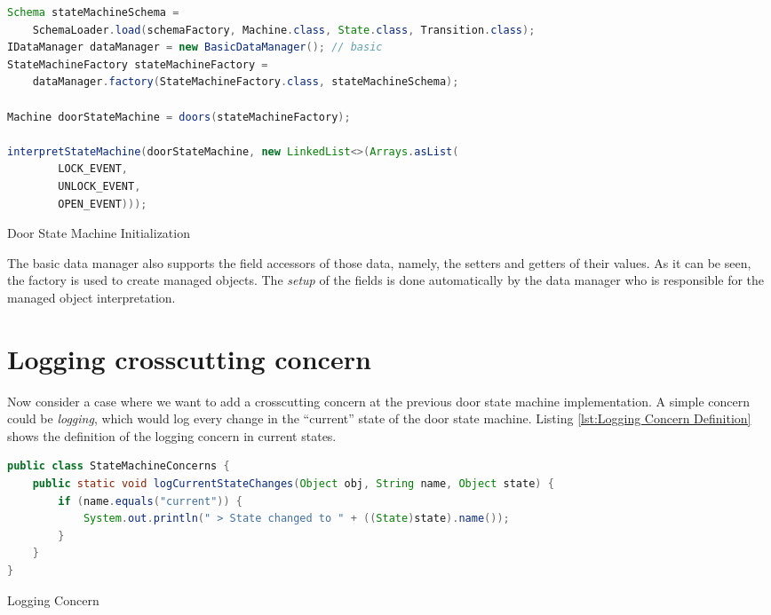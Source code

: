 \begin{sourcecode}
	\begin{lstlisting}[language=Java, escapechar=|]
Schema stateMachineSchema =
	SchemaLoader.load(schemaFactory, Machine.class, State.class, Transition.class);
IDataManager dataManager = new BasicDataManager(); // basic
StateMachineFactory stateMachineFactory = 
	dataManager.factory(StateMachineFactory.class, stateMachineSchema);

Machine doorStateMachine = doors(stateMachineFactory);

interpretStateMachine(doorStateMachine, new LinkedList<>(Arrays.asList(
		LOCK_EVENT,
		UNLOCK_EVENT,
		OPEN_EVENT)));
	\end{lstlisting}
	\caption{Door State Machine Initialization}
	\label{lst:Door_state_machine_initialization}
\end{sourcecode}

The basic data manager also supports the field accessors of those data, namely, the setters and getters of their values.
As it can be seen, the factory is used to create managed objects.
The \textit{setup} of the fields is done automatically by the data manager who is responsible for the managed object interpretation.

\section{Logging crosscutting concern}
Now consider a case where we want to add a crosscutting concern at the previous door state machine implementation.
A simple concern could be \textit{logging}, which would log every change in the ``current'' state of the door state machine.
Listing \ref{lst:Logging Concern Definition} shows the definition of the logging concern in current states.

\begin{sourcecode} [H]
	\begin{lstlisting}[language=Java, escapechar=|]
public class StateMachineConcerns {
	public static void logCurrentStateChanges(Object obj, String name, Object state) {
		if (name.equals("current")) {
			System.out.println(" > State changed to " + ((State)state).name());
		}
	}
}
	\end{lstlisting}
	\caption{Logging Concern}
	\label{lst:Logging Concern Definition}
\end{sourcecode}

